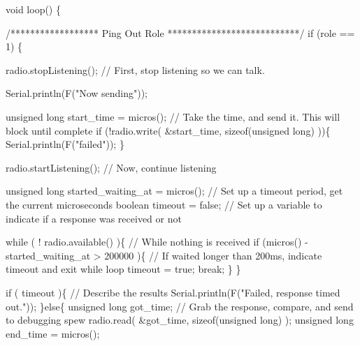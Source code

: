 \begin{DoxyCodeInclude}
\textcolor{keywordtype}{void} loop() \{
  
  
\textcolor{comment}{/****************** Ping Out Role ***************************/}  
\textcolor{keywordflow}{if} (role == 1)  \{
    
    radio.stopListening();                                    \textcolor{comment}{// First, stop listening so we can talk.}
    
    
    Serial.println(F(\textcolor{stringliteral}{"Now sending"}));

    \textcolor{keywordtype}{unsigned} \textcolor{keywordtype}{long} start\_time = micros();                             \textcolor{comment}{// Take the time, and send it.  This
       will block until complete}
     \textcolor{keywordflow}{if} (!radio.write( &start\_time, \textcolor{keyword}{sizeof}(\textcolor{keywordtype}{unsigned} \textcolor{keywordtype}{long}) ))\{
       Serial.println(F(\textcolor{stringliteral}{"failed"}));
     \}
        
    radio.startListening();                                    \textcolor{comment}{// Now, continue listening}
    
    \textcolor{keywordtype}{unsigned} \textcolor{keywordtype}{long} started\_waiting\_at = micros();               \textcolor{comment}{// Set up a timeout period, get the current
       microseconds}
    \textcolor{keywordtype}{boolean} timeout = \textcolor{keyword}{false};                                   \textcolor{comment}{// Set up a variable to indicate if a
       response was received or not}
    
    \textcolor{keywordflow}{while} ( ! radio.available() )\{                             \textcolor{comment}{// While nothing is received}
      \textcolor{keywordflow}{if} (micros() - started\_waiting\_at > 200000 )\{            \textcolor{comment}{// If waited longer than 200ms, indicate
       timeout and exit while loop}
          timeout = \textcolor{keyword}{true};
          \textcolor{keywordflow}{break};
      \}      
    \}
        
    \textcolor{keywordflow}{if} ( timeout )\{                                             \textcolor{comment}{// Describe the results}
        Serial.println(F(\textcolor{stringliteral}{"Failed, response timed out."}));
    \}\textcolor{keywordflow}{else}\{
        \textcolor{keywordtype}{unsigned} \textcolor{keywordtype}{long} got\_time;                                 \textcolor{comment}{// Grab the response, compare, and send to
       debugging spew}
        radio.read( &got\_time, \textcolor{keyword}{sizeof}(\textcolor{keywordtype}{unsigned} \textcolor{keywordtype}{long}) );
        \textcolor{keywordtype}{unsigned} \textcolor{keywordtype}{long} end\_time = micros();
        

\end{DoxyCodeInclude}
